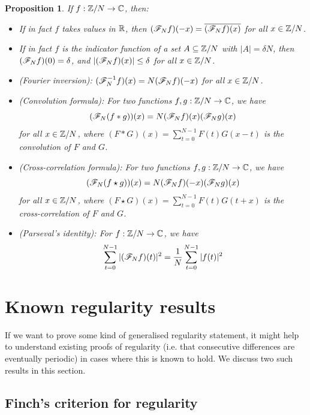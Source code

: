 \documentclass{report}
\newtheorem{proposition}[theorem]{Proposition}
\theoremstyle{remark}
\numberwithin{equation}{section}
\begin{document}
\begin{proposition}\label{prop:fourier}
If $f : \mathbb{Z}/N \to \mathbb{C}$, then: 

\begin{itemize}
\item If in fact $f$ takes values in $\mathbb{R}$, then
  $(\mathscr{F}_N f)(-x) = \overline{(\mathscr{F}_N f)(x)}$ for all $x \in \mathbb{Z}/N$.

\item If in fact $f$ is the indicator function of a set
  $A \subseteq \mathbb{Z}/N$ with $|A| = \delta N$, then
  $(\mathscr{F}_N f)(0) = \delta$, and $|(\mathscr{F}_N f)(x)| \leq \delta$ for all
  $x \in \mathbb{Z}/N$.

\item (Fourier inversion): $(\mathscr{F}_N^{-1} f)(x) = N (\mathscr{F}_N f)(-x)$ for
  all $x \in \mathbb{Z}/N$.

\item (Convolution formula): For two functions $f, g : \mathbb{Z}/N \to \mathbb{C}$,
  we have \[(\mathscr{F}_N (f \ast g))(x) = N(\mathscr{F}_N f)(x)(\mathscr{F}_N g)(x)\] for all
  $x \in \mathbb{Z}/N$, where $(F \ast G)(x) = \sum_{t=0}^{N-1} F(t)G(x-t)$ is
  the convolution of $F$ and $G$.

\item (Cross-correlation formula): For two functions
  $f, g : \mathbb{Z}/N \to \mathbb{C}$, we have
  \[(\mathscr{F}_N (f \star g))(x) = N(\mathscr{F}_N f)(-x)(\mathscr{F}_N g)(x)\] for all
  $x \in \mathbb{Z}/N$, where $(F \star G)(x) = \sum_{t=0}^{N-1} F(t)G(t+x)$
  is the cross-correlation of $F$ and $G$.

\item (Parseval's identity): For $f : \mathbb{Z}/N \to \mathbb{C}$, we
  have
  \[\sum_{t=0}^{N-1} |(\mathscr{F}_N f)(t)|^2 = \frac{1}{N} \sum_{t=0}^{N-1}
    |f(t)|^2\]
\end{itemize}
\end{proposition}

\section{Known regularity results}

If we want to prove some kind of generalised regularity statement, it
might help to understand existing proofs of regularity (i.e. that
consecutive differences are eventually periodic) in cases where this
is known to hold.  We discuss two such results in this section.

\subsection{Finch's criterion for regularity}
\end{document}
